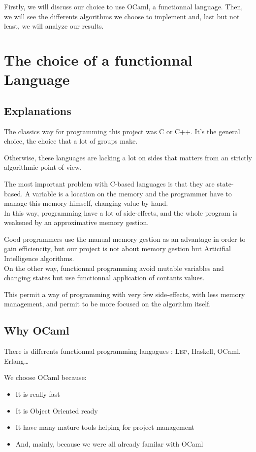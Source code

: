 \documentclass[12pt,a4paper,titlepage]{book}
\begin{document}
Firstly, we will discuss our choice to use OCaml, a functionnal language.
Then, we will see the differents algorithms we choose to implement and, last but not least, we will analyze our results.

\section{The choice of a functionnal Language}

\subsection{Explanations}

The classics way for programming this project was C or C++. It's the general choice, the choice that a lot of groups make.

Otherwise, these languages are lacking a lot on sides that matters from an strictly algorithmic point of view.

The most important problem with C-based languages is that they are state-based. A variable is a location on the memory and the programmer have to manage this memory himself, changing value by hand.\\

In this way, programming have a lot of side-effects, and the whole program is weakened by  an approximative memory gestion.

Good programmers use the manual memory gestion as an advantage in order to gain efficiencity, but our project is not about memory gestion but Articifial Intelligence algorithms.\\

On the other way, functionnal programming avoid mutable variables and changing states but use functionnal application of contants values.

This permit a way of programming with very few side-effects, with less memory management, and permit to be more focused on the algorithm itself.

\subsection{Why OCaml}

There is differents functionnal programming langagues : \textsc{Lisp}, Haskell, OCaml, Erlang\ldots

We choose OCaml because:
\begin{itemize}
\item It is really fast
\item It is Object Oriented ready
\item It have many mature tools helping for project management
\item And, mainly, because we were all already familar with OCaml
\end{itemize}
\end{document}
